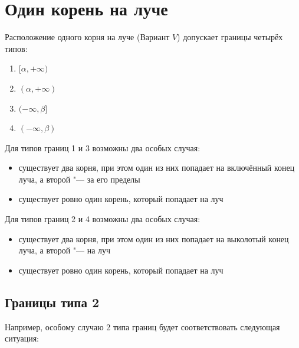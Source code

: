 \section {Один корень на луче}

Расположение одного корня на луче (Вариант $V$) допускает границы четырёх типов:

\begin {enumerate} [labelindent=\parindent, leftmargin=*]
    \item {$[\alpha, +\infty)$}
    \item {$(\alpha, +\infty)$}
    \item {$(-\infty, \beta]$}
    \item {$(-\infty, \beta)$}
\end {enumerate}

Для типов границ 1 и 3 возможны два особых случая: 

\begin {itemize}
    \item {существует два корня, при этом один из них попадает на включённый конец луча, а 
           второй "--- за его пределы}
    \item {существует ровно один корень, который попадает на луч }
\end {itemize}

Для типов границ 2 и 4 возможны два особых случая: 

\begin {itemize}
    \item {существует два корня, при этом один из них попадает на выколотый конец луча, а 
           второй "--- на луч}
    \item {существует ровно один корень, который попадает на луч }
\end {itemize}

\subsection {Границы типа 2}

Например, особому случаю 2 типа границ будет соответствовать следующая ситуация:

